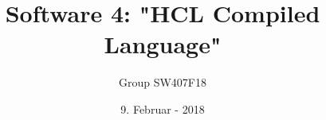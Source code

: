 \title{Software 4: "HCL Compiled Language"}        %
\date{9. Februar - 2018}							 %
\def\groupnumber{Group SW407F18}					 %
\author{\groupnumber}				 		  	 %

\let\theauthor\author
\let\thedate\date